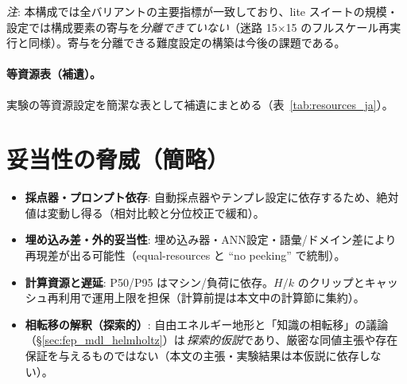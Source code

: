 \documentclass[ja=standard,xelatex]{bxjsarticle}
\begin{document}
\begin{table}[H]
  \centering
  \caption{Exp II--III 要約（等資源）。}
  \label{tab:exp23_summary_lite_ja}
  
\end{table}

\begin{table}[H]
  \centering
  \caption{アブレーション（EPC のみ／0-hop のみ／IG 強調）。}
  \label{tab:exp23_ablation_lite_ja}
  
\end{table}
\noindent\textit{注}: 本構成では全バリアントの主要指標が一致しており、lite スイートの規模・設定では構成要素の寄与を\emph{分離できていない}（迷路 15×15 のフルスケール再実行と同様）。寄与を分離できる難度設定の構築は今後の課題である。

\paragraph{等資源表（補遺）。} 実験の等資源設定を簡潔な表として補遺にまとめる（表~\ref{tab:resources_ja}）。

\begin{table}[H]
  \centering
  \caption{等資源表（簡約）。}
  \label{tab:resources_ja}
  
\end{table}

\section*{妥当性の脅威（簡略）}\label{sec:threats_validity_ja}
\begin{itemize}[leftmargin=1.4em]
  \item \textbf{採点器・プロンプト依存}: 自動採点器やテンプレ設定に依存するため、絶対値は変動し得る（相対比較と分位校正で緩和）。
  \item \textbf{埋め込み差・外的妥当性}: 埋め込み器・ANN設定・語彙/ドメイン差により再現差が出る可能性（equal-resources と “no peeking” で統制）。
  \item \textbf{計算資源と遅延}: P50/P95 はマシン/負荷に依存。$H/k$ のクリップとキャッシュ再利用で運用上限を担保（計算前提は本文中の計算節に集約）。
  \item \textbf{相転移の解釈（探索的）}: 自由エネルギー地形と「知識の相転移」の議論（\S\ref{sec:fep_mdl_helmholtz}）は\,\emph{探索的仮説}であり、厳密な同値主張や存在保証を与えるものではない（本文の主張・実験結果は本仮説に依存しない）。
\end{itemize}
\end{document}
